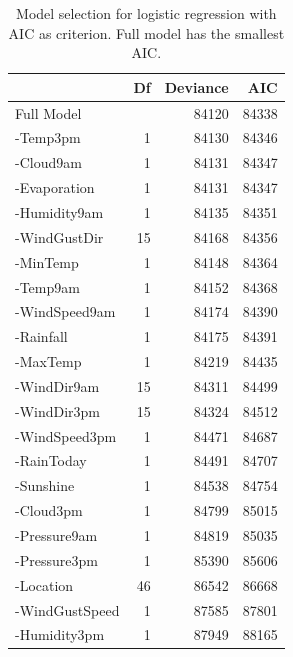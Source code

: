 \documentclass[11pt, a4paper, jou]{apa7}
\begin{document}
\begin{table}[h]
    \centering
    \caption{Model selection for logistic regression with AIC as criterion. Full model has the smallest AIC. }
    \label{tab:model_selection_aic}
    \begin{tabular}{lrrr}
    \hline
                   & Df & Deviance & AIC                          \\ \hline
    Full Model     &    & 84120    & {\color[HTML]{FE0000} 84338} \\
    -Temp3pm       & 1  & 84130    & 84346                        \\
    -Cloud9am      & 1  & 84131    & 84347                        \\
    -Evaporation   & 1  & 84131    & 84347                        \\
    -Humidity9am   & 1  & 84135    & 84351                        \\
    -WindGustDir   & 15 & 84168    & 84356                        \\
    -MinTemp       & 1  & 84148    & 84364                        \\
    -Temp9am       & 1  & 84152    & 84368                        \\
    -WindSpeed9am  & 1  & 84174    & 84390                        \\
    -Rainfall      & 1  & 84175    & 84391                        \\
    -MaxTemp       & 1  & 84219    & 84435                        \\
    -WindDir9am    & 15 & 84311    & 84499                        \\
    -WindDir3pm    & 15 & 84324    & 84512                        \\
    -WindSpeed3pm  & 1  & 84471    & 84687                        \\
    -RainToday     & 1  & 84491    & 84707                        \\
    -Sunshine      & 1  & 84538    & 84754                        \\
    -Cloud3pm      & 1  & 84799    & 85015                        \\
    -Pressure9am   & 1  & 84819    & 85035                        \\
    -Pressure3pm   & 1  & 85390    & 85606                        \\
    -Location      & 46 & 86542    & 86668                        \\
    -WindGustSpeed & 1  & 87585    & 87801                        \\
    -Humidity3pm   & 1  & 87949    & 88165                        \\ \hline
    \end{tabular}
\end{table}
\end{document}
